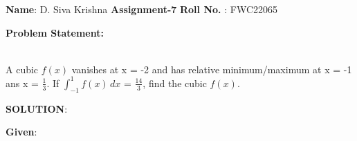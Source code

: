 \documentclass[10pt,a4paper]{report}
\begin{document}
\raggedright \textbf{Name}:\hspace{1mm} D. Siva Krishna\hspace{3cm} \Large \textbf{Assignment-7}\hspace{2.5cm} %
\normalsize \textbf{Roll No.} :\hspace{1mm} FWC22065\vspace{1cm}
\begin{multicols}{2}

\raggedright \textbf{Problem Statement:}\vspace{2mm}
\raggedright \\ A cubic $f(x)$ vanishes at x = -2 and has relative minimum/maximum at x = -1 ans x = $\frac{1}{3}$. If $\int_{-1}^{1}f(x) \,dx$ = $\frac{14}{3}$, find the cubic $f(x)$.\\
\vspace{5mm}
\raggedright \textbf{SOLUTION}:\vspace{2mm}\\
\raggedright \textbf{Given}:\vspace{2mm}\\


\end{multicols}
\end{document}
